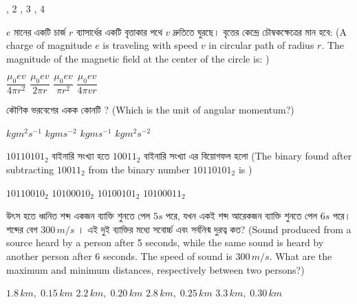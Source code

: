 \documentclass[addpoints]{exam}
\begin{document}
\begin{questions}
\begin{oneparchoices}
, 2
, 3
, 4
\end{oneparchoices}

\question  $ e $ মানের একটি চার্জ $ r $ ব্যাসার্ধের একটি বৃত্তাকার পথে $ v $ দ্রুতিতে ঘুরছে। বৃত্তের কেন্দ্রে চৌম্বকক্ষেত্রের মান হবে:  (A charge of magnitude $ e $ is traveling with speed $ v $ in circular path of radius $ r $. The magnitude of the magnetic field at the center of the circle is: )

\begin{oneparchoices}
\choice  $\dfrac{\mu_{0}ev}{4\pi r^{2}}$
\choice  $\dfrac{\mu_{0}ev}{2\pi r}$
\choice  $\dfrac{\mu_{0}ev}{\pi r^{2}}$
\choice  $\dfrac{\mu_{0}ev}{4\pi v r}$
\end{oneparchoices}

\question  কৌণিক ভরবেগের একক কোনটি ? (Which is the unit of angular momentum?)

\begin{oneparchoices}
\choice $ kgm^{2}s^{-1} $
\choice $ kgms^{-2} $
\choice $ kgms^{-1} $
\choice $ kgm^{2}s^{-2} $

\end{oneparchoices}

\question  $ 10110101_{2} $ বাইনারি সংখ্যা হতে $ 10011_{2} $ বাইনারি সংখ্যা এর বিয়োগফল হলো (The binary found after subtracting $ 10011_{2} $ from the binary number $ 10110101_{2} $ is )

\begin{oneparchoices}
\choice $ 10110010_{2} $
\choice $ 10100010_{2} $
\choice $ 10100101_{2} $
\choice $ 10100011_{2} $

\end{oneparchoices}


\question  উৎস হতে ধ্বনিত শব্দ একজন ব্যাক্তি শুনতে পেল $ 5s $ পরে, যখন একই শব্দ আরেকজন ব্যাক্তি শুনতে পেল $ 6s $ পরে। শব্দের বেগ $ 300\,m/s $ । এই দুই ব্যাক্তির মধ্যে সবোর্চ্চ এবং সর্বনিন্ম দুরত্ব কত? (Sound produced from a source heard by a person after 5 seconds, while the same sound is heard by another person after 6 seconds. The speed of sound is $ 300\,m/s  $. What are the maximum and minimum distances, respectively between two persons?)

\begin{oneparchoices}
\choice $ 1.8\,km,\; 0.15\,km$
\choice $ 2.2\,km,\; 0.20\,km $
\choice $ 2.8\,km,\; 0.25\,km $
\choice  $ 3.3\,km,\; 0.30\,km $
\end{oneparchoices}




\end{questions}
\end{document}
